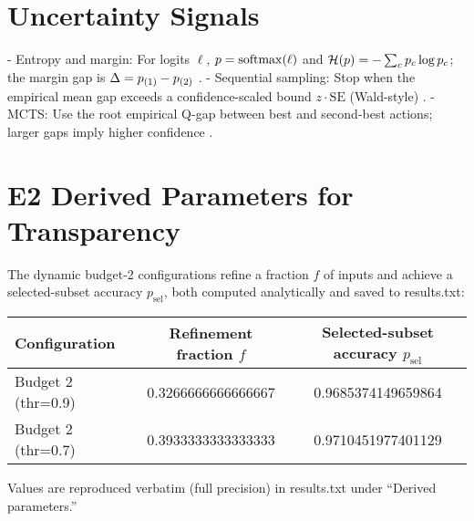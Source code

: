 \appendix

\section{Uncertainty Signals}
\label{app:uncertainty}
- Entropy and margin: For logits $\ell$, $p=\mathrm{softmax}(\ell)$ and $\mathcal{H}(p)=-\sum_c p_c \log p_c$; the margin gap is $\Delta = p_{(1)}-p_{(2)}$ \cite{Guo2017Calibration,Kaya2019ShallowDeep}.
- Sequential sampling: Stop when the empirical mean gap exceeds a confidence-scaled bound $z \cdot \mathrm{SE}$ (Wald-style) \cite{Wald1945Sequential}.
- MCTS: Use the root empirical Q-gap between best and second-best actions; larger gaps imply higher confidence \cite{Kocsis2006UCT,Coulom2006MCTS}.

\section{E2 Derived Parameters for Transparency}
\label{app:derived}
The dynamic budget-2 configurations refine a fraction $f$ of inputs and achieve a selected-subset accuracy $p_{\mathrm{sel}}$, both computed analytically and saved to results.txt:
\begin{center}
\begin{adjustbox}{width=\linewidth}
\begin{tabular}{l c c}
\toprule
Configuration & Refinement fraction $f$ & Selected-subset accuracy $p_{\mathrm{sel}}$ \\
\midrule
Budget 2 (thr=0.9) & 0.3266666666666667 & 0.9685374149659864 \\
Budget 2 (thr=0.7) & 0.3933333333333333 & 0.9710451977401129 \\
\bottomrule
\end{tabular}
\end{adjustbox}
\end{center}
Values are reproduced verbatim (full precision) in results.txt under ``Derived parameters.''

